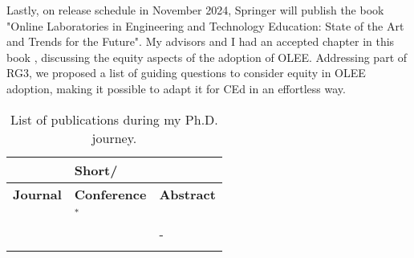  Lastly, on release schedule in November 2024, Springer will publish the book "Online Laboratories in Engineering and Technology Education: State of the Art and Trends for the Future". My advisors and I had an accepted chapter in this book \cite{bispojr:2024-online-lab}, discussing the equity aspects of the adoption of \gls{OLEE}. Addressing part of \gls{RG}3, we proposed a list of guiding questions to consider equity in \gls{OLEE} adoption, making it possible to adapt it for \gls{CEd} in an effortless way.

\begin{table}[ht]
\caption{List of publications during my \acrshort{Ph.D.} journey.}
\label{tbl:publications}
\centering
{}
\begin{tabular}{
    >{\centering\arraybackslash}m{5.5cm}|
    >{\centering\arraybackslash}m{5.4cm}|
    >{\centering\arraybackslash}m{3.1cm}
}
    \hline
    \multicolumn{2}{c|}{
        \textbf{Full}
    } &
    \textbf{Short/} \\
    \cline{1-2}
    \textbf{Journal} &
    \textbf{Conference} & 
    \textbf{Abstract}\\
    \hline 
    \cite{feitosa:2024}     
     &
        \cite{bispojr:2024-isdls}
        \newline
        \cite{bispojr:2024-nmp}$^*$
        \newline
        \cite{cavalcanti:2024-ieee}
        \newline
        \cite{cavalcanti:2024}     
    &
    \cite{pereira:2024}
    \newline
    \cite{boaventura:2024-sbgames}
    \newline
    \cite{bispojr:2024-urca}\\
    \hline
    
    \cite{bispojr:2023-rbie}
    \newline
    \cite{esmeraldo:2023}
    \newline
    \cite{freire:2023-rsc} &
    
    \cite{bispojr:2023-edi}
    \newline
    \cite{boaventura:2023} 
    \newline
    \cite{freire:2023-encompif} &
    
    -\\
    \hline

    \cite{santos:2022}
    \newline
    \cite{lima:2022} &

    \cite{bispojr:2022-educomp}
    \newline
    \cite{esmeraldo:2022} &


\end{tabular}
\end{table}
